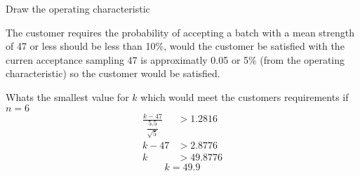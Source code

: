 \begin{example}
\begin{step}{Draw the operating characteristic}
    \end{step}
    
    \begin{step}{The customer requires the probability of accepting a batch with a mean strength of 47 or less should be less than 10\%, would the customer be satisfied with the curren acceptance sampling}
    47 is approximatly 0.05 or 5\% (from the operating characteristic) so the customer would be satisfied.
    \end{step}

    \begin{step}{Whats the smallest value for $k$ which would meet the customers requirements if $n = 6$}
    \begin{align*}
    \frac{k - 47}{\dfrac{5.5}{\sqrt{5}}} &> 1.2816 \\
    k - 47 &> 2.8776 \\
    k &> 49.8776
    \end{align*}
    $$k = 49.9$$
    \end{step}

    \end{example}